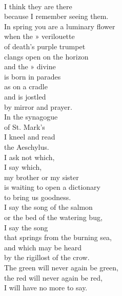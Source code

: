 \documentclass[smalldemyvopaper,11pt,twoside,onecolumn,openright,extrafontsizes]{memoir}
\begin{document}
\\I think they are there
\\because I remember seeing them.
\\In spring you are a luminary flower
\\when the » verilouette
\\of death's purple trumpet
\\clangs open on the horizon
\\and the » divine
\\is born in parades
\\as on a cradle
\\and is jostled
\\by mirror and prayer.
\\In the synagogue
\\of St. Mark's
\\I kneel and read
\\the Aeschylus.
\\I ask not which,
\\I say which,
\\my brother or my sister
\\is waiting to open a dictionary
\\to bring us goodness.
\\I say the song of the salmon
\\or the bed of the watering bug,
\\I say the song
\\that springs from the burning sea,
\\and which may be heard
\\by the rigillost of the crow.
\\The green will never again be green,
\\the red will never again be red,
\\I will have no more to say.
\end{document}
